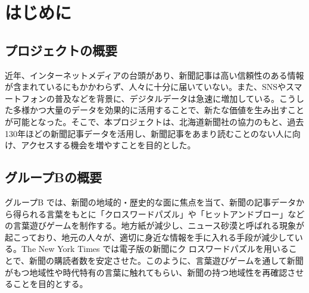 \chapter{はじめに}

\section{プロジェクトの概要}
近年、インターネットメディアの台頭があり、新聞記事は高い信頼性のある情報が含まれているにもかかわらず、人々に十分に届いていない。また、SNSやスマートフォンの普及などを背景に、デジタルデータは急速に増加している。こうした多様かつ大量のデータを効果的に活用することで、新たな価値を生み出すことが可能となった。そこで、本プロジェクトは、北海道新聞社の協力のもと、過去130年ほどの新聞記事データを活用し、新聞記事をあまり読むことのない人に向け、アクセスする機会を増やすことを目的とした。

\section{グループBの概要}
グループB では、新聞の地域的・歴史的な面に焦点を当て、新聞の記事データから得られる言葉をもとに「クロスワードパズル」や「ヒットアンドブロー」などの言葉遊びゲームを制作する。地方紙が減少し、ニュース砂漠と呼ばれる現象が起こっており、地元の人々が、適切に身近な情報を手に入れる手段が減少している。The New York Times では電子版の新聞にク
ロスワードパズルを用いることで、新聞の購読者数を安定させた。このように、言葉遊びゲームを通して新聞がもつ地域性や時代特有の言葉に触れてもらい、新聞の持つ地域性を再確認させることを目的とする。
